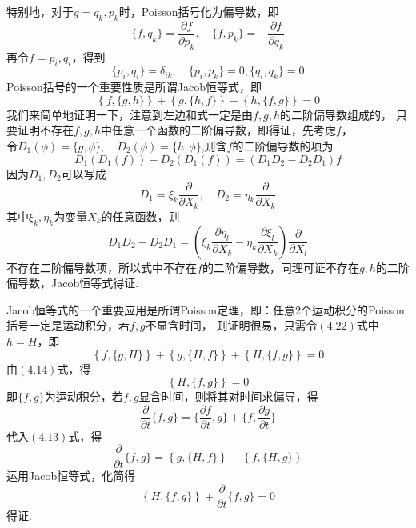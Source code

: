 特别地，对于$g=q_k,p_k$时，Poisson括号化为偏导数，即
\begin{equation}
    \{f,q_k\}=\frac{\partial f}{\partial p_k},\quad\{f,p_k\}=-\frac{\partial f}{\partial q_k}
\end{equation}
再令$f=p_i,q_i$，得到
\begin{equation}
    \{p_i,q_i\}=\delta_{ik},\quad \{p_i,p_k\}=0,\{q_i,q_k\}=0
\end{equation}
Poisson括号的一个重要性质是所谓Jacob恒等式，即
\begin{equation}
    \left\{f,\{g,h\}\right\}+\left\{g,\{h,f\}\right\}+\left\{h,\{f,g\}\right\}=0
\end{equation}
我们来简单地证明一下，注意到左边和式一定是由$f,g,h$的二阶偏导数组成的，
只要证明不存在$f,g,h$中任意一个函数的二阶偏导数，即得证，先考虑$f$，\\
令$D_1(\phi)=\{g,\phi\},\quad D_2(\phi)=\{h,\phi\}$,则含$f$的二阶偏导数的项为
\begin{equation}
    D_1\left(D_1(f)\right)-D_2\left(D_1(f)\right)=(D_1D_2-D_2D_1)f
\end{equation}
因为$D_1,D_2$可以写成
\begin{equation}
    D_1=\xi_k\frac{\partial}{\partial X_k},\quad D_2=\eta_k\frac{\partial}{\partial X_k}
\end{equation}
其中$\xi_k,\eta_k$为变量$X_k$的任意函数，则
\begin{equation}
    D_1D_2-D_2D_1=\left(\xi_k\frac{\partial\eta_l}{\partial X_k}-\eta_k\frac{\partial\xi_l}{\partial X_k}\right)
    \frac{\partial}{\partial X_l}
\end{equation}
不存在二阶偏导数项，所以式中不存在$f$的二阶偏导数，同理可证不存在$g,h$的二阶偏导数，Jacob恒等式得证.\par
Jacob恒等式的一个重要应用是所谓Poisson定理，即：任意2个运动积分的Poisson括号一定是运动积分，若$f,g$不显含时间，
则证明很易，只需令$(4.22)$式中$h=H$，即
\begin{equation}
    \left\{f,\{g,H\}\right\}+\left\{g,\{H,f\}\right\}+\left\{H,\{f,g\}\right\}=0
\end{equation}
由$(4.14)$式，得
\begin{equation}
    \left\{H,\{f,g\}\right\}=0
\end{equation}
即$\{f,g\}$为运动积分，若$f,g$显含时间，则将其对时间求偏导，得
\begin{equation}
    \frac{\partial}{\partial t}\{f,g\}=\{\frac{\partial f}{\partial t},g\}+\{f,\frac{\partial g}{\partial t}\}
\end{equation}
代入$(4.13)$式，得
\begin{equation}
    \frac{\partial}{\partial t}\{f,g\}=\left\{g,\{H,f\}\right\}-\left\{f,\{H,g\}\right\}
\end{equation}
运用Jacob恒等式，化简得
\begin{equation}
    \left\{H,\{f,g\}\right\}+\frac{\partial}{\partial t}\{f,g\}=0
\end{equation}
得证.
